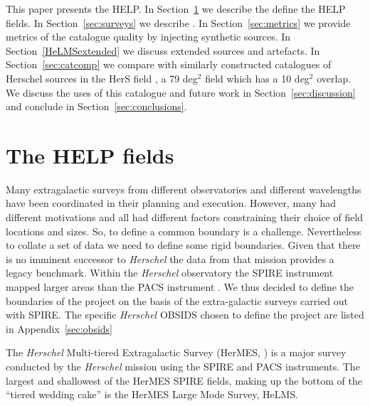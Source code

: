 \documentclass[usenatbib]{mnras}
\newcommand{\Herschel}{\textit{Herschel} }
\begin{document}
This paper presents the HELP. In Section~\ref{sec:fields} we describe the define
the HELP fields.   In Section~\ref{sec:surveys} we describe . In
Section~\ref{sec:metrics} we provide metrics of the catalogue quality by
injecting synthetic sources.   In Section~\ref{HeLMSextended} we discuss
extended sources and artefacts. In Section~\ref{sec:catcomp} we compare with
similarly constructed catalogues of Herschel sources in the  HerS field
\cite{Viero:2014lr}, a 79 deg$^2$ field which has a 10 deg$^2$ overlap.  We
discuss the uses of this catalogue and future work in
Section~\ref{sec:discussion} and conclude in Section~\ref{sec:conclusions}.


\section{The HELP fields}\label{sec:fields}

Many extragalactic surveys from different observatories and different
wavelengths have been coordinated in their planning and execution. However, many
had different motivations and all had different factors constraining their
choice of field locations and sizes. So, to define a common boundary is
a challenge.  Nevertheless to collate a set of data we need to define some rigid
boundaries. Given that there is no imminent successor to  \Herschel  the data
from that mission provides a legacy benchmark.  Within the \Herschel observatory
the SPIRE instrument \citep{Griffin:2010lr} mapped larger areas than the PACS
instrument \citep{Poglitsch:2010lr}. We thus decided to define the boundaries of
the project on the basis of the extra-galactic surveys carried out with SPIRE.
The specific \Herschel OBSIDS chosen to define the project are listed in
Appendix~\ref{sec:obsids}

The \Herschel Multi-tiered Extragalactic Survey (HerMES, \citealt{Oliver:2012})
is a major survey conducted by the \Herschel mission\citep{Pilbratt:2010lr}
using the SPIRE \citep{Griffin:2010lr} and PACS \citep{Poglitsch:2010lr}
instruments.  The largest and shallowest of the HerMES SPIRE fields, making up
the bottom of the ``tiered wedding cake''  is the HerMES Large Mode Survey,
HeLMS.

\begin{table}
  
  \caption{Summary of HELP fields.  The total area is 1269.1 deg.$^2$}
\end{table}
\end{document}
